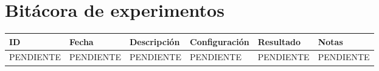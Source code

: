 \documentclass[11pt,a4paper]{article}
\begin{document}
\section*{Bitácora de experimentos}
\begin{longtable}{p{1.2cm}p{2cm}p{3.2cm}p{3.2cm}p{2.5cm}p{3cm}}
\toprule
ID & Fecha & Descripción & Configuración & Resultado & Notas\\
\midrule
\endhead
PENDIENTE & PENDIENTE & PENDIENTE & PENDIENTE & PENDIENTE & PENDIENTE\\
\bottomrule
\end{longtable}
\end{document}
